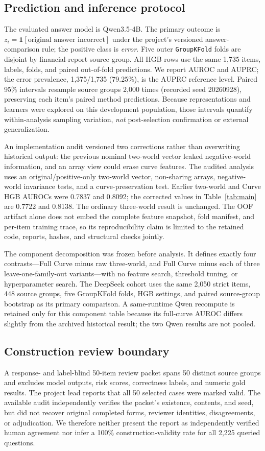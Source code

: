 \documentclass[11pt]{article}
\begin{document}
\subsection{Prediction and inference protocol}
The evaluated answer model is Qwen3.5-4B. The primary outcome is $z_i=\mathbf{1}[\text{original answer incorrect}]$ under the project's versioned answer-comparison rule; the positive class is \emph{error}. Five outer \texttt{GroupKFold} folds are disjoint by financial-report source group. All HGB rows use the same 1,735 items, labels, folds, and paired out-of-fold predictions. We report AUROC and AUPRC; the error prevalence, 1,375/1,735 (79.25\%), is the AUPRC reference level. Paired 95\% intervals resample source groups 2,000 times (recorded seed 20260928), preserving each item's paired method predictions. Because representations and learners were explored on this development population, those intervals quantify within-analysis sampling variation, \emph{not} post-selection confirmation or external generalization.

An implementation audit versioned two corrections rather than overwriting historical output: the previous nominal two-world vector leaked negative-world information, and an array view could erase curve features. The audited analysis uses an original/positive-only two-world vector, non-sharing arrays, negative-world invariance tests, and a curve-preservation test. Earlier two-world and Curve HGB AUROCs were 0.7837 and 0.8092; the corrected values in Table~\ref{tab:main} are 0.7722 and 0.8138. The ordinary three-world result is unchanged. The OOF artifact alone does not embed the complete feature snapshot, fold manifest, and per-item training trace, so its reproducibility claim is limited to the retained code, reports, hashes, and structural checks jointly.

The component decomposition was frozen before analysis. It defines exactly four contrasts---Full Curve minus raw three-world, and Full Curve minus each of three leave-one-family-out variants---with no feature search, threshold tuning, or hyperparameter search. The DeepSeek cohort uses the same 2,050 strict items, 448 source groups, five GroupKFold folds, HGB settings, and paired source-group bootstrap as its primary comparison. A same-runtime Qwen recompute is retained only for this component table because its full-curve AUROC differs slightly from the archived historical result; the two Qwen results are not pooled.

\subsection{Construction review boundary}
A response- and label-blind 50-item review packet spans 50 distinct source groups and excludes model outputs, risk scores, correctness labels, and numeric gold results. The project lead reports that all 50 selected cases were marked valid. The available audit independently verifies the packet's existence, contents, and seed, but did not recover original completed forms, reviewer identities, disagreements, or adjudication. We therefore neither present the report as independently verified human agreement nor infer a 100\% construction-validity rate for all 2,225 queried questions.
\end{document}
